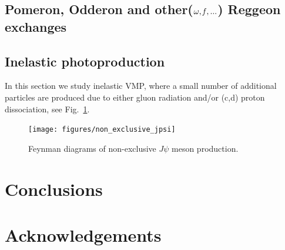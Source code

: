 \documentclass[12pt]{article}
\begin{document}
\subsection{Pomeron, Odderon and other($\omega, {\it f},...$) Reggeon exchanges}\label{Reggeons}

\subsection{Inelastic photoproduction}
In this section we study inelastic VMP, where a small number of additional particles are produced due to either gluon radiation and/or (c,d) proton dissociation, see Fig.~\ref{fig:vmp_non_exlcusive}.

\begin{figure}[!h]
\centering
 \texttt{[image: figures/non\_exclusive\_jpsi]}
 \caption{Feynman diagrams of non-exclusive $J\psi$ meson production.}
 \label{fig:vmp_non_exlcusive}
\end{figure}

\section{Conclusions}

\section*{Acknowledgements}
\end{document}
